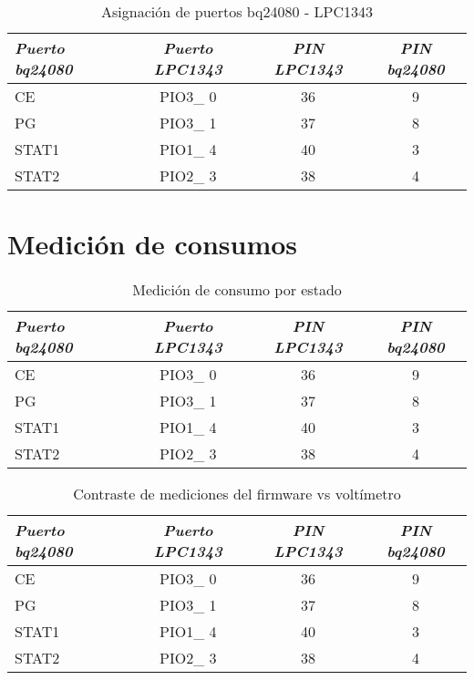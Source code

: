 \begin{table}[ht]
	\centering
	\caption{Asignación de puertos bq24080 - LPC1343}
	\begin{tabular}{@{} l *3c @{}}    \toprule
		\emph{\textbf{Puerto bq24080}} & \emph{\textbf{Puerto LPC1343}} & \emph{\textbf{PIN LPC1343}} & \emph{\textbf{PIN bq24080}}\\
		\midrule
		CE &  PIO3\_ 0 & 36 & 9	\\	
		PG	&  PIO3\_ 1 & 37 & 8\\
		STAT1 &  PIO1\_ 4 & 40 & 3\\
		STAT2 &  PIO2\_ 3 & 38 & 4\\
		\bottomrule
		\hline
	\end{tabular}
	\label{tab:bq}
\end{table}

\section{Medición de consumos}
\label{sec:Medición}

\begin{table}[ht]
	\centering
	\caption{Medición de consumo por estado}
	\begin{tabular}{@{} l *3c @{}}    \toprule
		\emph{\textbf{Puerto bq24080}} & \emph{\textbf{Puerto LPC1343}} & \emph{\textbf{PIN LPC1343}} & \emph{\textbf{PIN bq24080}}\\
		\midrule
		CE &  PIO3\_ 0 & 36 & 9	\\	
		PG	&  PIO3\_ 1 & 37 & 8\\
		STAT1 &  PIO1\_ 4 & 40 & 3\\
		STAT2 &  PIO2\_ 3 & 38 & 4\\
		\bottomrule
		\hline
	\end{tabular}
	\label{tab:bq}
\end{table}


\begin{table}[ht]
	\centering
	\caption{Contraste de mediciones del firmware vs voltímetro}
	\begin{tabular}{@{} l *3c @{}}    \toprule
		\emph{\textbf{Puerto bq24080}} & \emph{\textbf{Puerto LPC1343}} & \emph{\textbf{PIN LPC1343}} & \emph{\textbf{PIN bq24080}}\\
		\midrule
		CE &  PIO3\_ 0 & 36 & 9	\\	
		PG	&  PIO3\_ 1 & 37 & 8\\
		STAT1 &  PIO1\_ 4 & 40 & 3\\
		STAT2 &  PIO2\_ 3 & 38 & 4\\
		\bottomrule
		\hline
	\end{tabular}
	\label{tab:bq}
\end{table}
